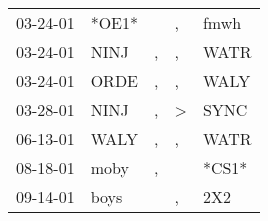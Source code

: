 \begin{supertabular}{p{0.07\textwidth}p{0.06\textwidth}p{0.02\textwidth}p{0.02\textwidth}p{0.06\textwidth}}
 03-24-01\textsuperscript{} &                   *OE1* &    &             , &  fmwh\textsuperscript{} \\
 03-24-01\textsuperscript{} &  NINJ\textsuperscript{} &  , &             , &  WATR\textsuperscript{} \\
 03-24-01\textsuperscript{} &  ORDE\textsuperscript{} &  , &             , &  WALY\textsuperscript{} \\
 03-28-01\textsuperscript{} &  NINJ\textsuperscript{} &  , &  \textgreater &  SYNC\textsuperscript{} \\
 06-13-01\textsuperscript{} &  WALY\textsuperscript{} &  , &             , &  WATR\textsuperscript{} \\
 08-18-01\textsuperscript{} &  moby\textsuperscript{} &  , &               &                   *CS1* \\
 09-14-01\textsuperscript{} &  boys\textsuperscript{} &    &             , &   2X2\textsuperscript{} \\
\end{supertabular}
